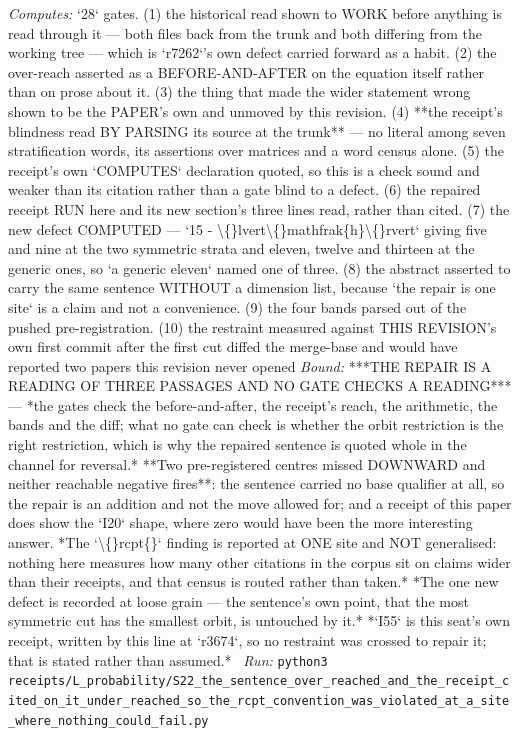 \begin{description}
\emph{Computes:} `28` gates. (1) the historical read shown to WORK before anything is read through it --- both files back from the trunk and both differing from the working tree --- which is `r7262`'s own defect carried forward as a habit. (2) the over-reach asserted as a BEFORE-AND-AFTER on the equation itself rather than on prose about it. (3) the thing that made the wider statement wrong shown to be the PAPER's own and unmoved by this revision. (4) **the receipt's blindness read BY PARSING its source at the trunk** --- no literal among seven stratification words, its assertions over matrices and a word census alone. (5) the receipt's own `COMPUTES` declaration quoted, so this is a check sound and weaker than its citation rather than a gate blind to a defect. (6) the repaired receipt RUN here and its new section's three lines read, rather than cited. (7) the new defect COMPUTED --- `15 - \textbackslash\{\}lvert\textbackslash\{\}mathfrak\{h\}\textbackslash\{\}rvert` giving five and nine at the two symmetric strata and eleven, twelve and thirteen at the generic ones, so `a generic eleven` named one of three. (8) the abstract asserted to carry the same sentence WITHOUT a dimension list, because `the repair is one site` is a claim and not a convenience. (9) the four bands parsed out of the pushed pre-registration. (10) the restraint measured against THIS REVISION's own first commit after the first cut diffed the merge-base and would have reported two papers this revision never opened
 \emph{Bound:}  ***THE REPAIR IS A READING OF THREE PASSAGES AND NO GATE CHECKS A READING*** --- *the gates check the before-and-after, the receipt's reach, the arithmetic, the bands and the diff; what no gate can check is whether the orbit restriction is the right restriction, which is why the repaired sentence is quoted whole in the channel for reversal.*  **Two pre-registered centres missed DOWNWARD and neither reachable negative fires**: the sentence carried no base qualifier at all, so the repair is an addition and not the move allowed for; and a receipt of this paper does show the `I20` shape, where zero would have been the more interesting answer.  *The `\textbackslash\{\}rcpt\{\}` finding is reported at ONE site and NOT generalised: nothing here measures how many other citations in the corpus sit on claims wider than their receipts, and that census is routed rather than taken.*  *The one new defect is recorded at loose grain --- the sentence's own point, that the most symmetric cut has the smallest orbit, is untouched by it.*  *`I55` is this seat's own receipt, written by this line at `r3674`, so no restraint was crossed to repair it; that is stated rather than assumed.*
\ \emph{Run:} \texttt{python3 receipts/L\_probability/S22\_the\_sentence\_over\_reached\_and\_the\_receipt\_cited\_on\_it\_under\_reached\_so\_the\_rcpt\_convention\_was\_violated\_at\_a\_site\_where\_nothing\_could\_fail.py}
\end{description}\endgroup
